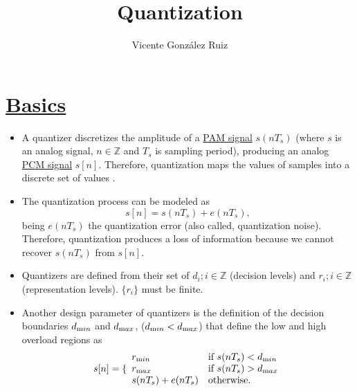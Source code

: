 
\title{Quantization}

\author{Vicente González Ruiz}

\maketitle

\section{\href{https://en.wikipedia.org/wiki/Quantization\_(signal\_processing)}{Basics}}
\begin{itemize}
\tightlist

\item
  A quantizer discretizes the amplitude of a
  \href{https://en.wikipedia.org/wiki/Pulse-amplitude_modulation}{PAM
    signal} \(s(nT_s)\) (where $s$ is an analog signal,
  $n\in{\mathbb{Z}}$ and $T_s$ is sampling period), producing an
  analog
  \href{https://en.wikipedia.org/wiki/Pulse-code_modulation}{PCM
    signal} $s[n]$. Therefore, quantization maps the 
  values of samples into a discrete set of values
  \cite{vetterli1995wavelets}.

\item
  The quantization process can be modeled as
  \begin{equation}
    s[n] = s(nT_s) + e(nT_s),
  \end{equation}
  being \(e(nT_s)\) the quantization error (also called, quantization
  noise). Therefore, quantization produces a loss of information
  because we cannot recover $s(nT_s)$ from $s[n]$.

\item
  Quantizers are defined from their set of \(d_i; i\in {\mathbb{Z}}\)
  (decision levels) and \(r_i; i\in {\mathbb{Z}}\) (representation
  levels). $\{r_i\}$ must be finite.

\item Another design parameter of quantizers is the definition of the
  decision boundaries $d_{\text min}$ and $d_{\text max}$, ($d_{\text min}<d_{\text max}$) that define the low and high
  overload regions as
  \begin{equation}
    s[n] = \{\begin{array}{ll}
    r_{\text min} & \text{if $s(nT_s)<d_{\text min}$} \\
    r_{\text max} & \text{if $s(nT_s)>d_{\text max}$} \\
    s(nT_s)+e(nT_s) & \text{otherwise}.
    \end{array}
  \end{equation}
  

\end{itemize}
